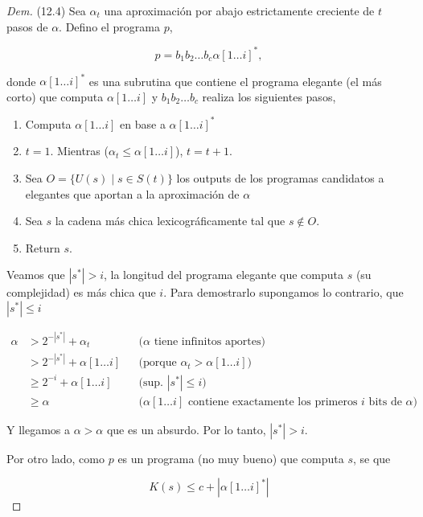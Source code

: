 \documentclass{article}
\theoremstyle{definition} %
\newcommand{\first}[2]{#2[1 \dots #1]}
\begin{document}
\begin{proof}[Dem](12.4)
    Sea $\alpha_t$ una aproximación por abajo estrictamente creciente de $t$
    pasos de $\alpha$. Defino el programa $p$,

    \[
        p = b_1 b_2 \dots b_c \first{i}{\alpha}^*,
    \]

    donde $\first{i}{\alpha}^*$ es una subrutina que contiene el programa
    elegante (el más corto) que computa $\first{i}{\alpha}$ y $b_1 b_2
    \dots b_c$ realiza los siguientes pasos,

    \begin{enumerate}
        \item Computa $\first{i}{\alpha}$ en base a
        $\first{i}{\alpha}^*$
        \item $t = 1$. Mientras ($\alpha_t \leq \first{i}{\alpha}$), $t = t + 1$.
        \item Sea $O = \{ U(s) \mid s \in S(t) \}$ los outputs de los
        programas candidatos a elegantes que aportan a la aproximación de
        $\alpha$
        \item Sea $s$ la cadena más chica lexicográficamente tal que $s \notin O$.
        \item Return $s$.
    \end{enumerate}

    Veamos que $|s^*| > i$, la longitud del programa elegante que computa $s$
    (su complejidad) es más chica que $i$. Para demostrarlo supongamos lo
    contrario, que $|s^*| \leq i$

    \begin{align*}
        \alpha 
        &> 2^{-|s^*|} + \alpha_t
            &&\text{($\alpha$ tiene infinitos aportes)}\\
        &> 2^{-|s^*|} + \first{i}{\alpha}
            &&\text{(porque $\alpha_t > \first{i}{\alpha}$)}\\
        &\geq 2^{-i} + \first{i}{\alpha}
            &&\text{(sup. $|s^*| \leq i$)}\\
        &\geq \alpha
            &&\text{($\first{i}{\alpha}$ contiene exactamente los primeros $i$ bits de $\alpha$)}
    \end{align*}

    Y llegamos a $\alpha > \alpha$ que es un absurdo. Por lo tanto, $|s^*| > i$.
    
    Por otro lado, como $p$ es un programa (no muy bueno) que computa $s$, se que

    \begin{equation}\label{eq:comp}
         K(s) \leq c + |\first{i}{\alpha}^*|
    \end{equation}


\end{proof}
\end{document}
